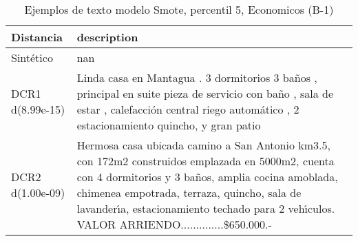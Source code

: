 \begin{table}[H]
\centering
\fontsize{10}{14}\selectfont
\caption{Ejemplos de texto modelo Smote, percentil 5, Economicos (B-1)}
\label{table-example-economicos-b-1-smote-enc-5p-text}
\begin{tabular}{|l|m{35em}|}
\hline
\rowcolor[gray]{0.8}
Distancia & description \\
\hline Sintético & nan \\
\hline DCR1 d(8.99e-15) & Linda casa en Mantagua .  3 dormitorios 3 ba\~nos , principal en suite  pieza de servicio con ba\~no , sala de estar , calefacci\'on central riego autom\'atico , 2 estacionamiento quincho, y gran patio \\
\hline DCR2 d(1.00e-09) & Hermosa casa ubicada camino a San Antonio km3.5, con 172m2 construidos emplazada en 5000m2, cuenta con 4 dormitorios y 3 ba\~nos, amplia cocina amoblada, chimenea empotrada, terraza, quincho, sala de lavander{\'\i}a, estacionamiento techado para 2 veh{\'\i}culos.
VALOR ARRIENDO..............\$650.000.- \\
\hline
\end{tabular}
\end{table}

